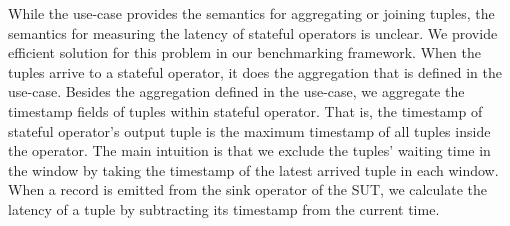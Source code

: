 While the use-case provides the semantics for aggregating or joining tuples, the semantics for measuring the latency of stateful operators is unclear.  We provide efficient solution for this problem in our benchmarking framework. When the tuples arrive to a stateful operator, it does the aggregation that is defined in the use-case. Besides the aggregation  defined in the use-case,  we aggregate the timestamp fields of tuples within stateful operator. That is, the timestamp of stateful operator's output tuple is the maximum timestamp of all tuples inside the operator.  The main intuition is that we exclude the tuples' waiting time in the window by taking the timestamp of the latest arrived tuple in each window. When a record is emitted from the sink operator of the SUT, we calculate the latency of a tuple by subtracting its timestamp from the current time.







